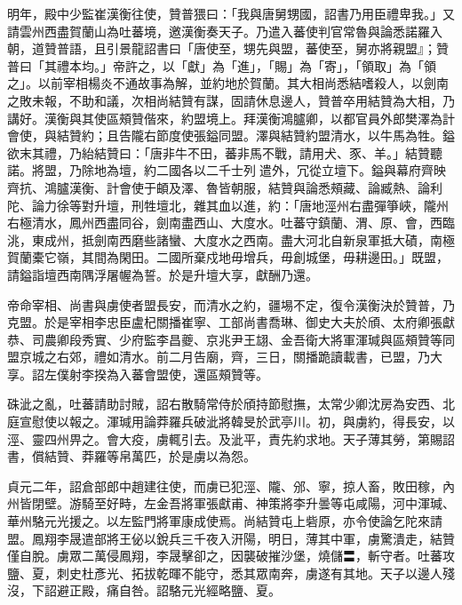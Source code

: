 \begin{pinyinscope}
 明年，殿中少監崔漢衡往使，贊普猥曰：「我與唐舅甥國，詔書乃用臣禮卑我。」又請雲州西盡賀蘭山為吐蕃境，邀漢衡奏天子。乃遣入蕃使判官常魯與論悉諾羅入朝，道贊普語，且引景龍詔書曰「唐使至，甥先與盟，蕃使至，舅亦將親盟』；贊普曰「其禮本均。」帝許之，以「獻」為「進」，「賜」為「寄」，「領取」為「領之」。以前宰相楊炎不通故事為解，並約地於賀蘭。其大相尚悉結嗜殺人，以劍南之敗未報，不助和議，次相尚結贊有謀，固請休息邊人，贊普卒用結贊為大相，乃講好。漢衡與其使區頰贊偕來，約盟境上。拜漢衡鴻臚卿，以都官員外郎樊澤為計會使，與結贊約；且告隴右節度使張鎰同盟。澤與結贊約盟清水，以牛馬為牲。鎰欲末其禮，乃紿結贊曰：「唐非牛不田，蕃非馬不戰，請用犬、豕、羊。」結贊聽諾。將盟，乃除地為壇，約二國各以二千士列遣外，冗從立壇下。鎰與幕府齊映齊抗、鴻臚漢衡、計會使于頔及澤、魯皆朝服，結贊與論悉頰藏、論臧熱、論利陀、論力徐等對升壇，刑牲壇北，雜其血以進，約：「唐地涇州右盡彈箏峽，隴州右極清水，鳳州西盡同谷，劍南盡西山、大度水。吐蕃守鎮蘭、渭、原、會，西臨洮，東成州，抵劍南西磨些諸蠻、大度水之西南。盡大河北自新泉軍抵大磧，南極賀蘭橐它嶺，其間為閑田。二國所棄戍地毋增兵，毋創城堡，毋耕邊田。」既盟，請鎰詣壇西南隅浮屠幄為誓。於是升壇大享，獻酬乃還。



 帝命宰相、尚書與虜使者盟長安，而清水之約，疆埸不定，復令漢衡決於贊普，乃克盟。於是宰相李忠臣盧杞關播崔寧、工部尚書喬琳、御史大夫於頎、太府卿張獻恭、司農卿段秀實、少府監李昌夔、京兆尹王翃、金吾衛大將軍渾瑊與區頰贊等同盟京城之右郊，禮如清水。前二月告廟，齊，三日，關播跪讀載書，已盟，乃大享。詔左僕射李揆為入蕃會盟使，還區頰贊等。



 硃泚之亂，吐蕃請助討賊，詔右散騎常侍於頎持節慰撫，太常少卿沈房為安西、北庭宣慰使以報之。渾瑊用論莽羅兵破泚將韓旻於武亭川。初，與虜約，得長安，以涇、靈四州畀之。會大疫，虜輒引去。及泚平，責先約求地。天子薄其勞，第賜詔書，償結贊、莽羅等帛萬匹，於是虜以為怨。



 貞元二年，詔倉部郎中趙建往使，而虜已犯涇、隴、邠、寧，掠人畜，敗田稼，內州皆閉壁。游騎至好畤，左金吾將軍張獻甫、神策將李升曇等屯咸陽，河中渾瑊、華州駱元光援之。以左監門將軍康成使焉。尚結贊屯上砦原，亦令使論乞陀來請盟。鳳翔李晟遣部將王佖以銳兵三千夜入汧陽，明日，薄其中軍，虜驚潰走，結贊僅自脫。虜眾二萬侵鳳翔，李晟擊卻之，因襲破摧沙堡，燒儲〓，斬守者。吐蕃攻鹽、夏，刺史杜彥光、拓拔乾暉不能守，悉其眾南奔，虜遂有其地。天子以邊人殘沒，下詔避正殿，痛自咎。詔駱元光經略鹽、夏。




\end{pinyinscope}
